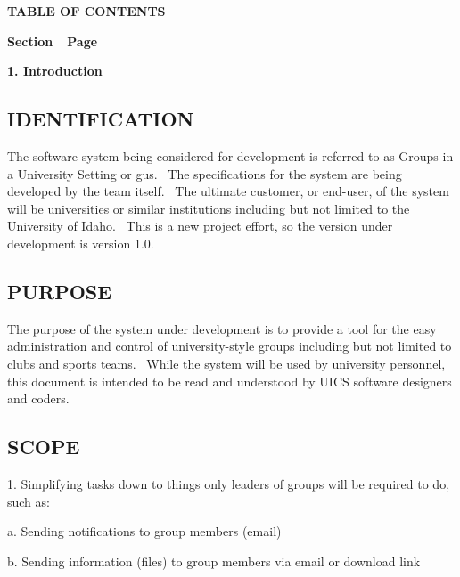 \documentclass[letterpaper]{article}
\newcommand\textstyleDefaultParagraphFont[1]{#1}
\begin{document}

{\centering\bfseries\color{black}
TABLE OF CONTENTS
\par}


\bigskip

{\bfseries\color{black}
Section\ \ Page}

\setcounter{tocdepth}{9}
\renewcommand\contentsname{Table of Contents}
\tableofcontents
\clearpage\clearpage\setcounter{page}{1}\pagestyle{MPii}
{\centering\bfseries\color{black}
\textstyleDefaultParagraphFont{1. Introduction}
\par}

\subsection[IDENTIFICATION]{\rmfamily IDENTIFICATION}
{\color{black}
The software system being considered for development is referred to as
Groups in a University Setting or gus. \ The specifications for the
system are being developed by the team itself. \ The ultimate customer,
or end-user, of the system will be universities or similar institutions
including but not limited to the University of Idaho. \ This is a new
project effort, so the version under development is version 1.0.}

\subsection[PURPOSE]{\rmfamily PURPOSE}
{\color{black}
The purpose of the system under development is to provide a tool for the
easy administration and control of university-style groups including
but not limited to clubs and sports teams. \ While the system will be
used by university personnel, this document is intended to be read and
understood by UICS software designers and coders.}

\subsection[SCOPE]{\rmfamily SCOPE}
{\color{black}
\textstyleDefaultParagraphFont{1. Simplifying tasks down to things only
leaders of groups will be required to do, such as:}}

{\color{black}
\textstyleDefaultParagraphFont{a. Sending notifications to group members
(email)}}

{\color{black}
\textstyleDefaultParagraphFont{b. Sending information (files) to group
members via email or download link}}
\end{document}
